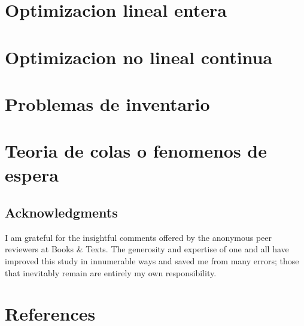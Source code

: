 \documentclass[
  letterpaper,
  DIV=11,
  numbers=noendperiod]{scrreprt}
\newlength{\cslhangindent}
\newlength{\cslentryspacingunit} %
\newenvironment{CSLReferences}[2] %
 {%
  \setlength{\parindent}{0pt}
  \ifodd #1
  \let\oldpar\par
  \def\par{\hangindent=\cslhangindent\oldpar}
  \fi
  \setlength{\parskip}{#2\cslentryspacingunit}
 }%
 {}
\theoremstyle{definition}
\theoremstyle{definition}
\theoremstyle{remark}
\begin{document}
\hypertarget{optimizacion-lineal-entera}{%
\chapter{Optimizacion lineal entera}\label{optimizacion-lineal-entera}}

\hypertarget{optimizacion-no-lineal-continua}{%
\chapter{Optimizacion no lineal
continua}\label{optimizacion-no-lineal-continua}}

\hypertarget{problemas-de-inventario}{%
\chapter{Problemas de inventario}\label{problemas-de-inventario}}

\hypertarget{teoria-de-colas-o-fenomenos-de-espera}{%
\chapter{Teoria de colas o fenomenos de
espera}\label{teoria-de-colas-o-fenomenos-de-espera}}

\hypertarget{acknowledgments}{%
\section{Acknowledgments}\label{acknowledgments}}

I am grateful for the insightful comments offered by the anonymous peer
reviewers at Books \& Texts. The generosity and expertise of one and all
have improved this study in innumerable ways and saved me from many
errors; those that inevitably remain are entirely my own responsibility.


\hypertarget{references}{%
\chapter*{References}\label{references}}


\hypertarget{refs}{}
\begin{CSLReferences}{0}{0}
\end{CSLReferences}

\appendix
{}


\printbibliography[title=apendice]
\end{document}
